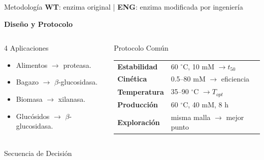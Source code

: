 \begin{frame}{Metodología \hfill{\tiny\color{TextoSuave}\textbf{WT}: enzima original \quad | \quad \textbf{ENG}: enzima modificada por ingeniería}}



{\color{Cian}\bfseries Diseño y Protocolo}\par
\vspace{0.07cm}

\begin{columns}[T,onlytextwidth]
\begin{block}{4 Aplicaciones}
\small
\begin{itemize}
\item Alimentos $\rightarrow$ proteasa.
\item Bagazo $\rightarrow$ $\beta$-glucosidasa.
\item Biomasa $\rightarrow$ xilanasa.
\item Glucósidos $\rightarrow$ $\beta$-glucosidasa.
\end{itemize}
\end{block}

\begin{block}{Protocolo Común}
\scriptsize
\begin{tabularx}{\linewidth}{@{}>{\bfseries}lY@{}}
Estabilidad & 60 $^{\circ}$C, 10 mM $\rightarrow t_{50}$\\[0.04cm]
Cinética & 0.5--80 mM $\rightarrow$ eficiencia\\[0.04cm]
Temperatura & 35--90 $^{\circ}$C $\rightarrow T_{opt}$\\[0.04cm]
Producción & 60 $^{\circ}$C, 40 mM, 8 h\\[0.04cm]
Exploración & misma malla $\rightarrow$ mejor punto
\end{tabularx}
\end{block}
\end{columns}

\vspace{0.11cm}
\begin{block}{Secuencia de Decisión}
\centering
{}
\end{block}

\vfill
{}
\end{frame}
